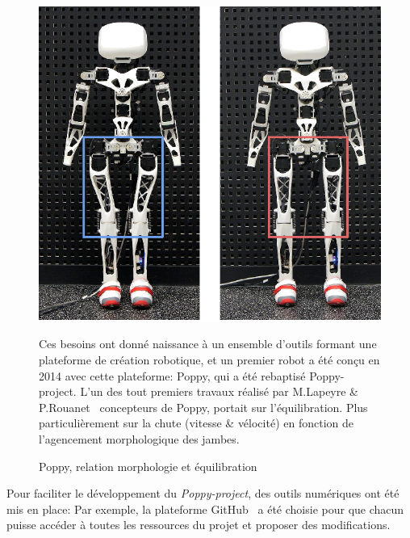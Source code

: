         \begin{figure}[!h]
        \begin{minipage}{0.475\linewidth}
            \centering
            \includegraphics[width=0.975\linewidth]{Figures/poppy_legs}
            \caption{Poppy, relation morphologie et équilibration~}
            \label{fig:poppy_legs}
        \end{minipage}
        \hfill
        \begin{minipage}{0.5\linewidth}
        \myDefautStyle
            Ces besoins ont donné naissance à un ensemble d'outils formant une plateforme de création robotique, et un premier robot a été conçu en 2014 avec cette plateforme: Poppy, qui a été rebaptisé Poppy-project.
            L'un des tout premiers travaux réalisé par M.Lapeyre \& P.Rouanet~ concepteurs de Poppy, portait sur l'équilibration. Plus particulièrement sur la chute  (vitesse \& vélocité) en fonction de l'agencement morphologique des jambes.%
        \end{minipage}
        \end{figure}\par%
        Pour faciliter le développement du \textit{Poppy-project}, des outils numériques ont été mis en place: Par exemple, la plateforme GitHub~ a été choisie pour que chacun puisse accéder à toutes les ressources du projet et proposer des modifications.
